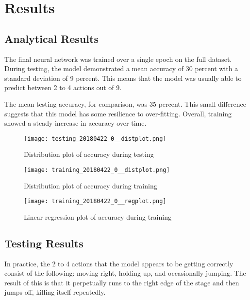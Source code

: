 \chapter{Results}



\section{Analytical Results}

The final neural network was trained over a single epoch on the full dataset. During testing, the model demonstrated a mean accuracy of 30 percent with a standard deviation of 9 percent. This means that the model was usually able to predict between 2 to 4 actions out of 9.

The mean testing accuracy, for comparison, was 35 percent. This small difference suggests that this model has some resilience to over-fitting. Overall, training showed a steady increase in accuracy over time.

\begin{figure}
    \caption{Distribution plot of accuracy during testing}
    \centering
    \texttt{[image: testing\_20180422\_0\_\_distplot.png]} \\
\end{figure}

\begin{figure}
    \caption{Distribution plot of accuracy during training}
    \centering
    \texttt{[image: training\_20180422\_0\_\_distplot.png]} \\
\end{figure}

\begin{figure}
    \caption{Linear regression plot of accuracy during training}
    \centering
    \texttt{[image: training\_20180422\_0\_\_regplot.png]} \\
\end{figure}





\section{Testing Results}

In practice, the 2 to 4 actions that the model appears to be getting correctly consist of the following: moving right, holding up, and occasionally jumping. The result of this is that it perpetually runs to the right edge of the stage and then jumps off, killing itself repeatedly.

